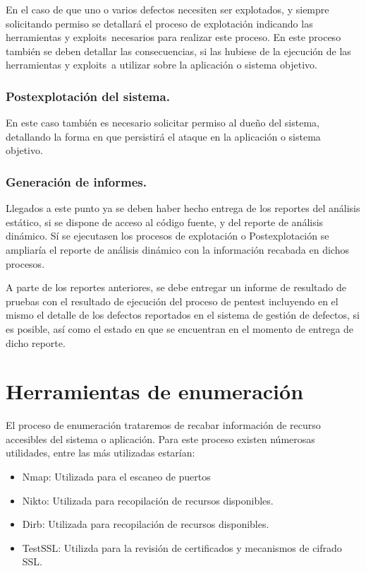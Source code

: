 En el caso de que uno o varios defectos necesiten ser explotados, y siempre solicitando permiso se detallará 
el proceso de explotación indicando las herramientas y \glspl{exploit} necesarios para realizar este proceso. 
En este proceso también se deben detallar las consecuencias, si las hubiese de la ejecución de las herramientas y 
exploits a utilizar sobre la aplicación o sistema objetivo.

\subsubsection{Postexplotación del sistema.}

En este caso también es necesario solicitar permiso al dueño del sistema, detallando 
la forma en que persistirá el ataque en la aplicación o sistema objetivo.

\subsubsection{Generación de informes.}

Llegados a este punto ya se deben haber hecho entrega de los reportes del análisis estático, si se dispone de acceso al código fuente, y del reporte de análisis dinámico. Sí se ejecutasen los procesos de explotación o Postexplotación se ampliaría el reporte de análisis dinámico con la información recabada en dichos procesos.

A parte de los reportes anteriores, se debe entregar un informe de resultado de 
pruebas con el resultado de ejecución del proceso de pentest incluyendo en 
el mismo el detalle de los defectos reportados en el sistema de gestión de 
defectos, si es posible, así como el estado en que se encuentran en el momento
de entrega de dicho reporte.

\newpage
\section{Herramientas de enumeración}

El proceso de enumeración trataremos de recabar información de recurso accesibles del sistema 
o aplicación. Para este proceso existen númerosas utilidades, entre las más utilizadas estarían:

\begin{itemize}
    \item Nmap:     Utilizada para el escaneo de puertos
    \item Nikto:    Utilizada para recopilación de recursos disponibles.
    \item Dirb:     Utilizada para recopilación de recursos disponibles.
    \item TestSSL:  Utilizda para la revisión de certificados y mecanismos de cifrado SSL.
\end{itemize}

